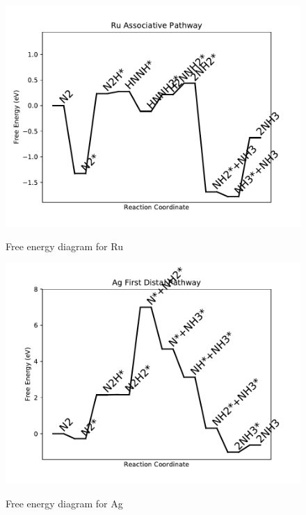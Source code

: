 \documentclass[journal=jacsat,manuscript=article]{achemso}
\begin{document}
\begin{figure}
\includegraphics[width=1\linewidth]{data/plots/Ru_associative.pdf}
\label{fig:Ru_associative}
\caption{Free energy diagram for Ru}
\end{figure}

\newpage
\begin{figure}
\includegraphics[width=1\linewidth]{data/plots/Ag_distal_1.pdf}
\label{fig:Ag_distal_1}
\caption{Free energy diagram for Ag}
\end{figure}
\end{document}
